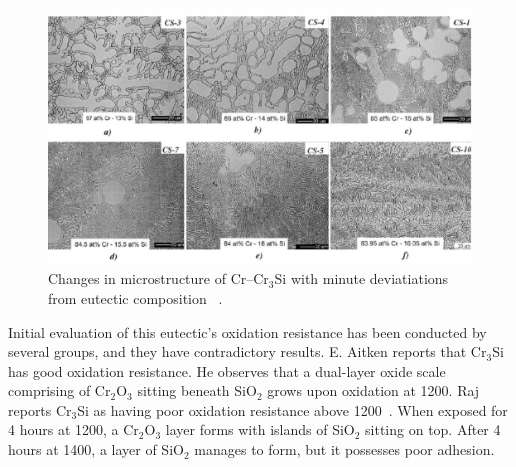 \begin{figure}[H]
\begin{center}
\includegraphics{Cr-Cr3Si_micros}
\caption{Changes in microstructure of Cr--Cr$_3$Si with minute deviatiations from eutectic composition ~\cite{bei03a}.}\label{fig:Cr-Cr3Si_micros}
\end{center}
\end{figure}
%
Initial evaluation of this eutectic's oxidation resistance has been conducted by several groups, and they have contradictory results.  E. Aitken reports that Cr$_3$Si has good oxidation resistance.  He observes that a dual-layer oxide scale comprising of Cr$_2$O$_3$ sitting beneath SiO$_2$ grows upon oxidation at 1200\celsius.   Raj reports Cr$_3$Si as having poor oxidation resistance above 1200\celsius ~\cite{raj95}.   When exposed for 4 hours at 1200\celsius, a Cr$_2$O$_3$ layer forms with islands of SiO$_2$ sitting on top.  After 4 hours at 1400\celsius, a layer of SiO$_2$ manages to form, but it possesses poor adhesion.  
 
